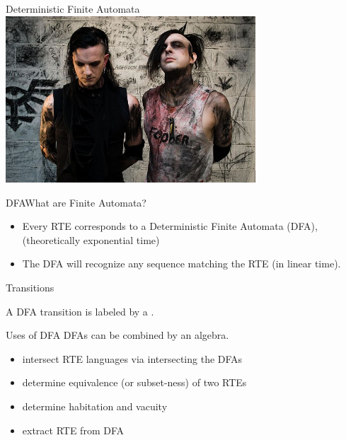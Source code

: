 


\begin{frame}{Deterministic Finite Automata}
  \centering
  \includegraphics[width=0.7\textwidth]{fa-band.jpg}
\end{frame}


\begin{frame}{DFA}{What are Finite Automata?}
  \begin{itemize}
  \item   Every RTE corresponds to a Deterministic Finite Automata (DFA),  (theoretically exponential time)

  \item   The DFA will recognize any sequence matching the RTE (in linear time).

  \end{itemize}
\end{frame}

\begin{frame}{ Transitions}

  \scalebox{0.8}{}

  A DFA transition is labeled by a .
\end{frame}



\begin{frame}{Uses of DFA}
  DFAs can be combined by an algebra.

  \begin{itemize}
  \item intersect RTE languages via intersecting the DFAs
  \item determine equivalence (or subset-ness) of two RTEs
  \item determine habitation and vacuity
  \item extract RTE from DFA
  \end{itemize}
\end{frame}



